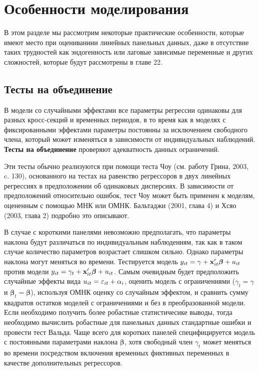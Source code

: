 \section{Особенности моделирования}

В этом разделе мы рассмотрим некоторые практические особенности, которые имеют место при оцениваниии линейных панельных данных, даже в отсутствие таких трудностей как эндогенность или лаговые зависимые переменные и других сложностей, которые будут рассмотрены в главе 22.


\subsection{Тесты на объединение}

В модели со случайными эффектами все параметры регрессии одинаковы для разных кросс-секций и временных периодов, в то время как в моделях с фиксированными эффектами параметры постоянны за исключением свободного члена, который может изменяться в зависимости от индивидуальных наблюдений. \textbf{Тесты на  объединение} проверяют адекватность данных ограничений.

Эти тесты обычно реализуются при помощи теста Чоу (см. работу Грина, 2003, c. 130), основанного на тестах на равенство регрессоров в двух линейных регрессиях в предположении об одинаковых дисперсиях. В зависимости от предположений относительно ошибок, тест Чоу может быть применен к моделям, оцененным с помощью МНК или ОМНК. Бальтаджи (2001, глава 4) и Хсяо (2003, глава 2) подробно это описывают.

В случае с короткими панелями невозможно предполагать, что параметры наклона будут различаться по индивидуальным наблюдениям, так как в таком случае количество параметров возрастает слишком сильно. Однако параметры наклона могут меняться во времени. Тестируется модель $y_{it}=\gamma+\mathbf{x}'_{it} \bm\beta+u_{it}$ против модели $y_{it}=\gamma_t+\mathbf{x}'_{it} \bm\beta+u_{it}$. Самым очевидным будет предположить случайные эффекты вида $u_{it}=\varepsilon_{it}+\alpha_i$, оценить модель с ограничениями ($\gamma_t=\gamma$ и $\bm\beta_t=\bm\beta$), используя ОМНК оценку со случайным эффектом, и сравнить сумму квадратов остатков моделей с ограничениями и без в преобразованной модели. Если необходимо получить более робастные статистичесике выводы, тогда необходимо вычислить робастные для панельных данных стандартные ошибки и провести тест Вальда. Чаще всего для коротких панелей специфицируется модель с постоянными параметрами наклона $\bm\beta$, хотя свободный член $\gamma_t$ может меняться во времени посредством включения временных фиктивных переменных в качестве дополнительных регрессоров.

